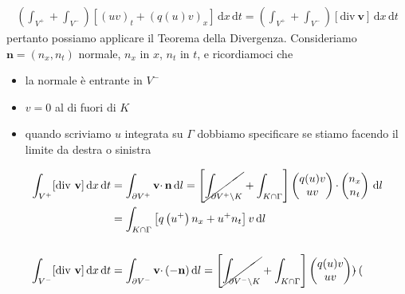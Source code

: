 \documentclass[10pt,a4paper,twoside,openright]{book}
\newcommand{\de}{\,\mathrm d}
\newcommand{\dx}{\de x}
\newcommand{\dl}{\de l}
\newcommand{\dt}{\de t}
\begin{document}
\begin{dimostrazione}
\begin{gather*}
        \left(\int _{V^{+}} +\int _{V^{-}}\right)[(uv)_{t} +(q(u) v)_{x}] \dx\dt=\left(\int _{V^{+}} +\int _{V^{-}}\right)[\mathrm{div} \ \mathbf{v}] \dx\dt
    \end{gather*}
    pertanto possiamo applicare il Teorema della Divergenza. Consideriamo $\mathbf{n} =(n_{x} ,n_{t})$ normale, $n_{x}$ in $x$, $n_{t}$ in $t$, e ricordiamoci che
    \begin{itemize}
        \item la normale è entrante in $V^{-}$
        \item $v=0$ al di fuori di $K$
        \item quando scriviamo $u$ integrata su $\Gamma $ dobbiamo specificare se stiamo facendo il limite da destra o sinistra
    \end{itemize}
    \begin{align*}
        \int _{V^{+}}[\mathrm{div} \ \mathbf{v}] \dx\dt & =\int _{\partial V^{+}}\mathbf{v} \cdotp \mathbf{n} \dl=\left[\cancel{\int _{\partial V^{+} \setminus K}} +\int _{K\cap \Gamma }\right]
        \begin{pmatrix}
            q(u) v \\
            uv
        \end{pmatrix} \cdotp
        \begin{pmatrix}
            n_{x} \\
            n_{t}
        \end{pmatrix} \dl                                                                                                                                                              \\
                                                        & =\int _{K\cap \Gamma }\left[ q\left(u^{+}\right) n_{x} +u^{+} n_{t}\right] v\dl                                                            \\
                                                        &                                                                                                                                            \\
        \int _{V^{-}}[\mathrm{div} \ \mathbf{v}] \dx\dt & =\int _{\partial V^{-}}\mathbf{v} \cdotp (-\mathbf{n}) \dl=\left[\cancel{\int _{\partial V^{-} \setminus K}} +\int _{K\cap \Gamma }\right]
        \begin{pmatrix}
            q(u) v \\
            uv
        \end{pmatrix} \cdotp
        \begin{pmatrix}

\end{pmatrix}
\end{align*}
\end{dimostrazione}
\end{document}
